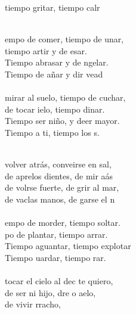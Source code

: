 \begin{cancion}
	tiempo  gritar, tiempo  calr\\\jump\\
	\begin{chorus}%
	empo de comer, tiempo de unar,\\
	tiempo artir y de esar.\\
	Tiempo  abrasar y de ngelar.\\
	Tiempo de añar y dir vead\\
\jump\\
	 mirar al suelo, tiempo de cuchar,\\
	de tocar ielo, tiempo dinar.\\
	Tiempo  ser niño, y deer mayor.\\
	Tiempo a ti, tiempo  los s.\\
	\end{chorus}%
	\jump\\
	 volver atrás, conveirse en sal,\\
	de aprelos dientes, de mir aás\\
	de volrse fuerte, de grir al mar,\\
	de vaclas manos, de garse el n\\
\jump\\
	empo de morder, tiempo  soltar.\\
	po de plantar, tiempo  arrar.\\
	Tiempo  aguantar, tiempo  explotar\\
	Tiempo uardar, tiempo  rar.\\
\jump\\
	 tocar el cielo al dec te quiero,\\
	de ser ni hijo, dre o aelo,\\
	de vivir rracho, \\

\end{cancion}
